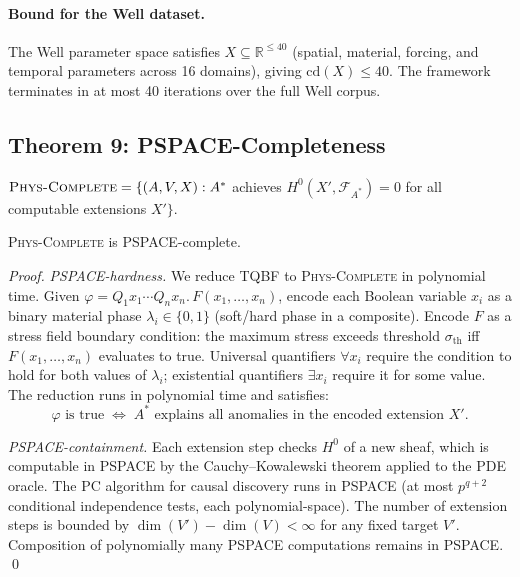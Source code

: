 \documentclass[twoside,11pt]{article}
\newcommand{\FA}{\mathcal{F}}
\newcommand{\cd}{\mathrm{cd}}
\begin{document}
\paragraph{Bound for the Well dataset.}
The Well parameter space satisfies $X \subseteq \mathbb{R}^{\leq 40}$
(spatial, material, forcing, and temporal parameters across 16
domains), giving $\cd(X) \leq 40$. The framework terminates in at
most 40 iterations over the full Well corpus.

\subsection{Theorem 9: PSPACE-Completeness}

\begin{definition}
$\textsc{Phys-Complete} = \{(A, V, X) : A^*$ achieves $H^0(X',
\FA_{A^*}) = 0$ for all computable extensions $X'\}$.
\end{definition}

\begin{theorem}
\label{thm:pspace}
\textsc{Phys-Complete} is \textrm{PSPACE}-complete.
\end{theorem}

\begin{proof}
\emph{PSPACE-hardness.} We reduce TQBF to \textsc{Phys-Complete}
in polynomial time. Given $\varphi = Q_1 x_1 \cdots Q_n x_n.\,
F(x_1,\ldots,x_n)$, encode each Boolean variable $x_i$ as a binary
material phase $\lambda_i \in \{0,1\}$ (soft/hard phase in a
composite). Encode $F$ as a stress field boundary condition: the
maximum stress exceeds threshold $\sigma_{\mathrm{th}}$ iff
$F(x_1,\ldots,x_n)$ evaluates to true. Universal quantifiers
$\forall x_i$ require the condition to hold for both values of
$\lambda_i$; existential quantifiers $\exists x_i$ require it for
some value. The reduction runs in polynomial time and satisfies:
\[
  \varphi\text{ is true} \;\Leftrightarrow\;
  A^*\text{ explains all anomalies in the encoded extension }X'.
\]

\emph{PSPACE-containment.} Each extension step checks $H^0$ of a
new sheaf, which is computable in \textrm{PSPACE} by the
Cauchy--Kowalewski theorem applied to the PDE oracle. The PC
algorithm for causal discovery runs in \textrm{PSPACE} (at most
$p^{q+2}$ conditional independence tests, each polynomial-space).
The number of extension steps is bounded by $\dim(V') - \dim(V)
< \infty$ for any fixed target $V'$. Composition of polynomially
many \textrm{PSPACE} computations remains in \textrm{PSPACE}. \qed
\end{proof}
\end{document}
